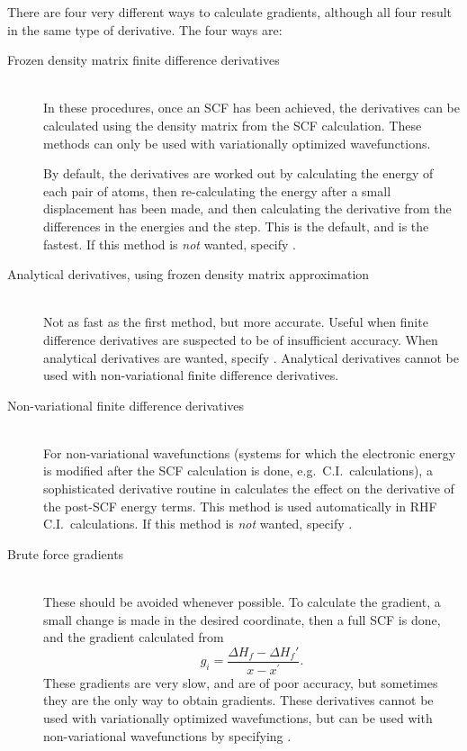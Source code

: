 There are four very different ways to calculate gradients, although all four
result in the same type of derivative.  The four ways are:
\begin{description}
\item[Frozen density matrix finite difference derivatives]~\\
In these procedures, once an SCF has been achieved, the derivatives can be 
calculated using the density matrix from the SCF calculation.  These methods 
can only be used with variationally optimized wavefunctions. 

By default, the derivatives are worked out by calculating the energy of each
pair of atoms, then re-calculating the energy after a small displacement has
been made, and then calculating the derivative from the differences in the
energies and the step.  This is the default, and is the fastest.  If this
method is {\em not} wanted, specify .

\item[Analytical derivatives, using frozen density matrix approximation]~\\
Not as fast as the first method, but more accurate.  Useful when finite
difference derivatives are suspected to be of insufficient accuracy.  When
analytical derivatives are wanted, specify .  Analytical
derivatives cannot be used with non-variational finite difference derivatives.

\item[Non-variational finite difference derivatives]~\\ 
For non-variational wavefunctions (systems
for which the electronic energy is modified after the SCF calculation is done,
e.g.\ C.I.\ calculations), a  sophisticated derivative routine in 
calculates the effect on the  derivative of the post-SCF energy terms.  This
method is used automatically in RHF C.I.\ calculations.  If this method is {\em
not} wanted, specify .

\item[Brute force gradients]~\\
These should be avoided whenever possible.  To calculate the gradient, a small
change is made in the desired coordinate, then a full SCF is done, and the
gradient calculated from
$$ 
g_i = \frac{\Delta H_f-\Delta H_f'}{x-x^{'}}.
$$ 
These gradients are very slow, and are of poor accuracy, but sometimes they
are the only way to obtain  gradients.  These derivatives cannot be used
with variationally optimized wavefunctions, but can be used with 
non-variational wavefunctions by specifying .  
\end{description}

